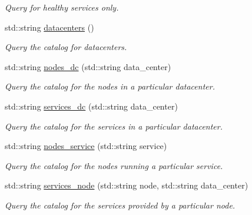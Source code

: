 \begin{DoxyCompactItemize}
\begin{DoxyCompactList}\small\item\em Query for healthy services only. \end{DoxyCompactList}\item 
\hypertarget{classConsulAdmin_a9086263fd0d739607b30706dc86ad047}{std\-::string \hyperlink{classConsulAdmin_a9086263fd0d739607b30706dc86ad047}{datacenters} ()}\label{classConsulAdmin_a9086263fd0d739607b30706dc86ad047}

\begin{DoxyCompactList}\small\item\em Query the catalog for datacenters. \end{DoxyCompactList}\item 
\hypertarget{classConsulAdmin_a20888c98619dc9bed63ecda78085fd4a}{std\-::string \hyperlink{classConsulAdmin_a20888c98619dc9bed63ecda78085fd4a}{nodes\-\_\-dc} (std\-::string data\-\_\-center)}\label{classConsulAdmin_a20888c98619dc9bed63ecda78085fd4a}

\begin{DoxyCompactList}\small\item\em Query the catalog for the nodes in a particular datacenter. \end{DoxyCompactList}\item 
\hypertarget{classConsulAdmin_aaac11b600131ef18b5d88d51102a8007}{std\-::string \hyperlink{classConsulAdmin_aaac11b600131ef18b5d88d51102a8007}{services\-\_\-dc} (std\-::string data\-\_\-center)}\label{classConsulAdmin_aaac11b600131ef18b5d88d51102a8007}

\begin{DoxyCompactList}\small\item\em Query the catalog for the services in a particular datacenter. \end{DoxyCompactList}\item 
\hypertarget{classConsulAdmin_ad667e4ff5102614a50a0e719eccd1ea4}{std\-::string \hyperlink{classConsulAdmin_ad667e4ff5102614a50a0e719eccd1ea4}{nodes\-\_\-service} (std\-::string service)}\label{classConsulAdmin_ad667e4ff5102614a50a0e719eccd1ea4}

\begin{DoxyCompactList}\small\item\em Query the catalog for the nodes running a particular service. \end{DoxyCompactList}\item 
\hypertarget{classConsulAdmin_a42bf71278508f190a7eeb345c9c692e1}{std\-::string \hyperlink{classConsulAdmin_a42bf71278508f190a7eeb345c9c692e1}{services\-\_\-node} (std\-::string node, std\-::string data\-\_\-center)}\label{classConsulAdmin_a42bf71278508f190a7eeb345c9c692e1}

\begin{DoxyCompactList}\small\item\em Query the catalog for the services provided by a particular node. \end{DoxyCompactList}\end{DoxyCompactItemize}


